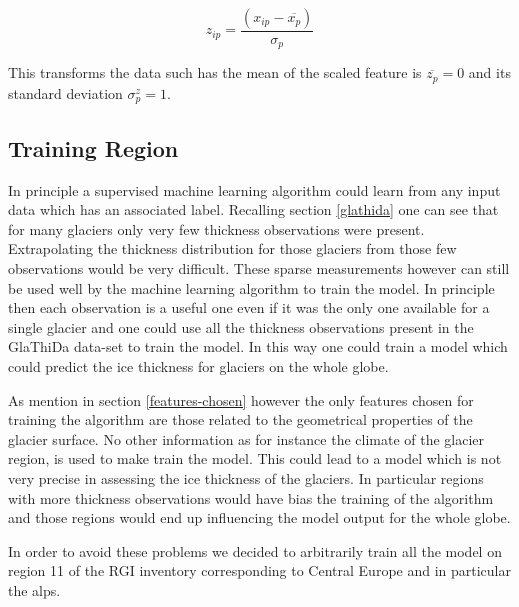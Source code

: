 \begin{equation}\label{eq:scale}
z_{ip} = \frac{(x_{ip} - \overline{x_p})}{\sigma_p}
\end{equation}

This transforms the data such has the mean of the scaled feature is $\overline{z_p}=0$ and its standard deviation $\sigma^z_p=1$.

\subsection{Training Region}\label{alps}
In principle a supervised machine learning algorithm could learn from any input data which has an associated label. Recalling section \ref{glathida} one can see that for many glaciers only very few thickness observations were present. Extrapolating the thickness distribution for those glaciers from those few observations would be very difficult. These sparse measurements however can still be used well by the machine learning algorithm to train the model. In principle then each observation is a useful one even if it was the only one available for a single glacier and one could use all the thickness observations present in the GlaThiDa data-set to train the model. In this way one could train a model which could predict the ice thickness for glaciers on the whole globe.

As mention in section \ref{features-chosen} however the only features chosen for training the algorithm are those related to the geometrical properties of the glacier surface. No other information as for instance the climate of the glacier region, is used to make train the model. This could lead to a model which is not very precise in assessing the ice thickness of the glaciers. In particular regions with more thickness observations would have bias the training of the algorithm and those regions would end up influencing the model output for the whole globe.

In order to avoid these problems we decided to arbitrarily train all the model on region 11 of the RGI inventory corresponding to Central Europe and in particular the alps. 


